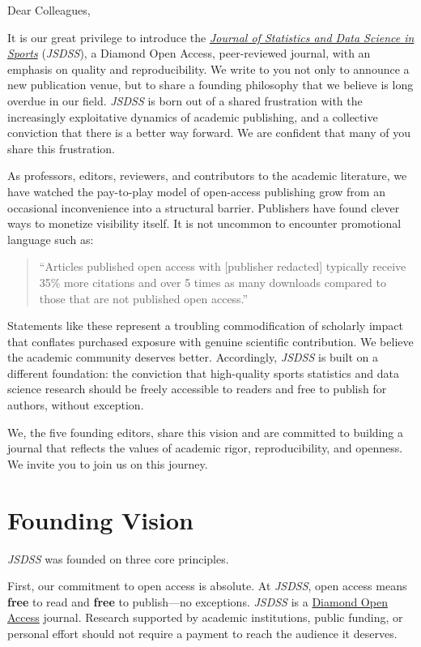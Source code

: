 \documentclass[
  12pt]{article}
\begin{document}
Dear Colleagues,

It is our great privilege to introduce the
\href{https://jsds-sports.github.io/}{\emph{Journal of Statistics and
Data Science in Sports}} (\emph{JSDSS}), a Diamond Open Access,
peer-reviewed journal, with an emphasis on quality and reproducibility.
We write to you not only to announce a new publication venue, but to
share a founding philosophy that we believe is long overdue in our
field. \emph{JSDSS} is born out of a shared frustration with the
increasingly exploitative dynamics of academic publishing, and a
collective conviction that there is a better way forward. We are
confident that many of you share this frustration.

As professors, editors, reviewers, and contributors to the academic
literature, we have watched the pay-to-play model of open-access
publishing grow from an occasional inconvenience into a structural
barrier. Publishers have found clever ways to monetize visibility
itself. It is not uncommon to encounter promotional language such as:

\begin{quote}
``Articles published open access with {[}publisher redacted{]} typically
receive 35\% more citations and over 5 times as many downloads compared
to those that are not published open access.''
\end{quote}

Statements like these represent a troubling commodification of scholarly
impact that conflates purchased exposure with genuine scientific
contribution. We believe the academic community deserves better.
Accordingly, \emph{JSDSS} is built on a different foundation: the
conviction that high-quality sports statistics and data science research
should be freely accessible to readers and free to publish for authors,
without exception.

We, the five founding editors, share this vision and are committed to
building a journal that reflects the values of academic rigor,
reproducibility, and openness. We invite you to join us on this journey.

\section{Founding Vision}\label{founding-vision}

\emph{JSDSS} was founded on three core principles.

First, our commitment to open access is absolute. At \emph{JSDSS}, open
access means \textbf{free} to read and \textbf{free} to publish---no
exceptions. \emph{JSDSS} is a
\href{https://en.wikipedia.org/wiki/Diamond_open_access}{Diamond Open
Access} journal. Research supported by academic institutions, public
funding, or personal effort should not require a payment to reach the
audience it deserves.
\end{document}
